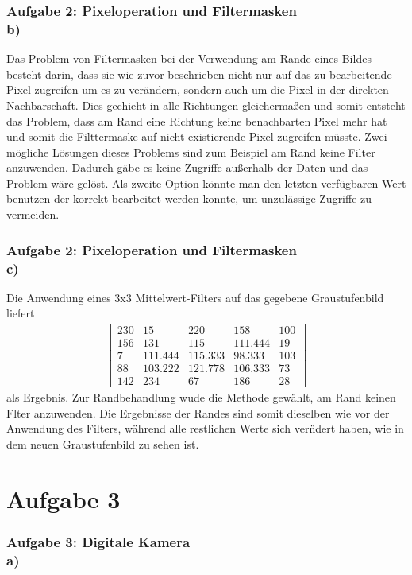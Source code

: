 \documentclass[accentcolor=tud9c,colorbacktitle,inverttitle,landscape,german,presentation,t]{tudbeamer}
\begin{document}
	\begin{frame}
		\frametitle{Aufgabe 2: Pixeloperation und Filtermasken \\ b)}
		Das Problem von Filtermasken bei der Verwendung am Rande eines Bildes besteht darin, dass sie wie zuvor beschrieben nicht nur auf das zu bearbeitende Pixel zugreifen um es  zu ver\"andern, sondern auch um die Pixel in der direkten Nachbarschaft. Dies gechieht in alle Richtungen gleicherma\ss en und somit entsteht das Problem, dass am Rand eine Richtung keine benachbarten Pixel mehr hat und somit die Filttermaske auf nicht existierende Pixel zugreifen m\"usste. Zwei m\"ogliche L\"osungen dieses Problems sind zum Beispiel am Rand keine Filter anzuwenden. Dadurch g\"abe es keine Zugriffe au\ss erhalb der Daten und das Problem w\"are gel\"ost. Als zweite Option k\"onnte man den letzten verf\"ugbaren Wert benutzen der korrekt bearbeitet werden konnte, um unzul\"assige Zugriffe zu vermeiden. 
	\end{frame}
	
	\begin{frame}
		\frametitle{Aufgabe 2: Pixeloperation und Filtermasken \\ c)}
	
		Die Anwendung eines 3x3 Mittelwert-Filters auf das gegebene Graustufenbild liefert
		\begin{align*}
		\begin{bmatrix}
		230 & 15 & 220 & 158 & 100 \\
		156 & 131 & 115 & 111.444 & 19\\
		7 & 111.444 & 115.333 & 98.333 & 103\\
		88 & 103.222 & 121.778 & 106.333 & 73\\
		142 &234 & 67 & 186 & 28
		\end{bmatrix}
		\end{align*}
		als Ergebnis. Zur Randbehandlung wude die Methode gew\"ahlt, am Rand keinen Flter anzuwenden. Die Ergebnisse der Randes sind somit dieselben wie vor der Anwendung des Filters, w\"ahrend alle restlichen Werte sich ver\"ndert haben, wie in dem neuen Graustufenbild zu sehen ist.
	\end{frame}

\section{Aufgabe 3}
	\begin{frame}
		\frametitle{Aufgabe 3: Digitale Kamera \\ a)}
	\end{frame}
	
\end{document}
